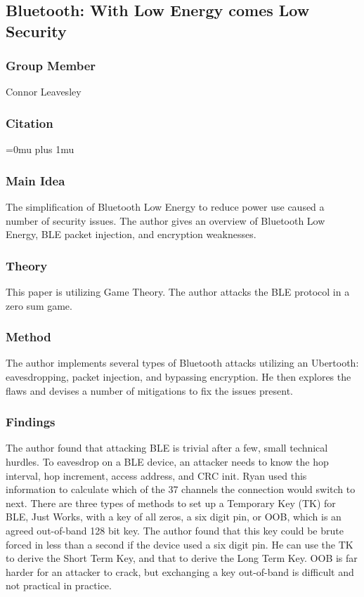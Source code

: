 \noindent
\subsection{Bluetooth: With Low Energy comes Low Security}

\subsubsection{Group Member}

\noindent
Connor Leavesley

\noindent
\subsubsection{Citation}

\Urlmuskip=0mu plus 1mu\relax

\subsubsection{Main Idea}

\noindent
The simplification of Bluetooth Low Energy to reduce power use caused a number of security issues. The author gives an overview of Bluetooth Low Energy, BLE packet injection, and encryption weaknesses. 

\subsubsection{Theory}

\noindent
This paper is utilizing Game Theory. The author attacks the BLE protocol in a zero sum game. 

\subsubsection{Method}

\noindent
The author implements several types of Bluetooth attacks utilizing an Ubertooth: eavesdropping, packet injection, and bypassing encryption. He then explores the flaws and devises a number of mitigations to fix the issues present. 

\subsubsection{Findings}

\noindent
The author found that attacking BLE is trivial after a few, small technical hurdles. To eavesdrop on a BLE device, an attacker needs to know the hop interval, hop increment, access address, and CRC init. Ryan used this information to calculate which of the 37 channels the connection would switch to next. There are three types of methods to set up a Temporary Key (TK) for BLE, Just Works, with a key of all zeros, a six digit pin, or OOB, which is an agreed out-of-band 128 bit key. The author found that this key could be brute forced in less than a second if the device used a six digit pin. He can use the TK to derive the Short Term Key, and that to derive the Long Term Key. OOB is far harder for an attacker to crack, but exchanging a key out-of-band is difficult and not practical in practice. 

